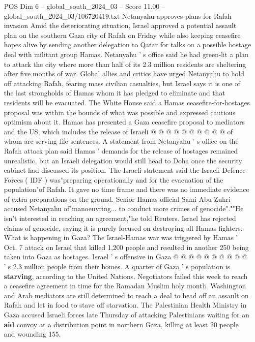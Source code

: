 \begin{textsample}{POS Dim 6 – global\_south\_2024\_03 – Score 11.00 – global\_south\_2024\_03/106720419.txt}
Netanyahu approves plans for Rafah invasion Amid the deteriorating situation, Israel approved a potential assault plan on the southern Gaza city of Rafah on Friday while also keeping ceasefire hopes alive by sending another delegation to Qatar for talks on a possible hostage deal with militant group Hamas.
Netanyahu ' s office said he had green-lit a plan to attack the city where more than half of its 2.3 million residents are sheltering after five months of war.
Global allies and critics have urged Netanyahu to hold off attacking Rafah, fearing mass civilian casualties, but Israel says it is one of the last strongholds of Hamas whom it has pledged to eliminate and that residents will be evacuated.
The White House said a Hamas ceasefire-for-hostages proposal was within the bounds of what was possible and expressed cautious optimism about it.
Hamas has presented a Gaza ceasefire proposal to mediators and the US, which includes the release of Israeli @ @ @ @ @ @ @ @ @ @ of whom are serving life sentences.
A statement from Netanyahu ' s office on the Rafah attack plan said Hamas ' demands for the release of hostages remained unrealistic, but an Israeli delegation would still head to Doha once the security cabinet had discussed its position.
The Israeli statement said the Israeli Defence Forces ( IDF ) was"preparing operationally and for the evacuation of the population"of Rafah.
It gave no time frame and there was no immediate evidence of extra preparations on the ground.
Senior Hamas official Sami Abu Zuhri accused Netanyahu of"manoeuvring... to conduct more crimes of genocide".""He isn't interested in reaching an agreement,"he told Reuters.
Israel has rejected claims of genocide, saying it is purely focused on destroying all Hamas fighters.
What is happening in Gaza?
The Israel-Hamas war was triggered by Hamas ' Oct. 7 attack on Israel that killed 1,200 people and resulted in another 250 being taken into Gaza as hostages.
Israel ' s offensive in Gaza @ @ @ @ @ @ @ @ @ @ ' s 2.3 million people from their homes.
A quarter of Gaza ' s population is \textbf{starving}, according to the United Nations.
Negotiators failed this week to reach a ceasefire agreement in time for the Ramadan Muslim holy month.
Washington and Arab mediators are still determined to reach a deal to head off an assault on Rafah and let in food to stave off starvation.
The Palestinian Health Ministry in Gaza accused Israeli forces late Thursday of attacking Palestinians waiting for an \textbf{aid} convoy at a distribution point in northern Gaza, killing at least 20 people and wounding 155.

\end{textsample}
